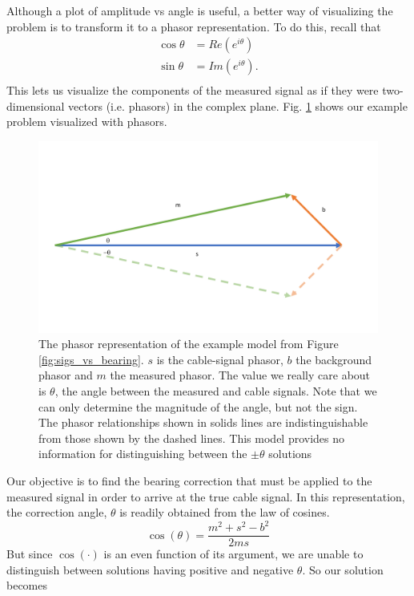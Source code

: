 \documentclass[paper=a4, fontsize=11pt]{scrartcl}
\numberwithin{equation}{section}		%
\numberwithin{figure}{section}			%
\numberwithin{table}{section}				%
\begin{document}
\begin{appendices}
Although a plot of amplitude vs angle is useful, a better way of visualizing the problem is to transform it to a phasor representation.  To do this, recall that
\begin{align}
        \cos{\theta} &= Re\left(e^{i\theta}\right) \\
        \sin{\theta} &= Im\left(e^{i\theta}\right). \\
\end{align}
This lets us visualize the components of the measured signal as if they were two-dimensional vectors (i.e. phasors) in the complex plane. Fig. \ref{fig:phasor_base} shows our example problem visualized with phasors.
\begin{figure}
  \caption{
  The phasor representation of the example model from Figure \ref{fig:sigs_vs_bearing}. $s$ is the cable-signal phasor, $b$ the background phasor and $m$ the measured phasor.  The value we really care about is $\theta$, the angle between the measured and cable signals.  Note that we can only determine the magnitude of the angle, but not the sign.  The phasor relationships shown in solids lines are indistinguishable from those shown by the dashed lines.  This model provides no information for distinguishing between the $\pm\theta$ solutions}
  \label{fig:phasor_base}
  \centering
  \includegraphics[width=1.0\textwidth]{figures/phasor_base.pdf}
\end{figure}
Our objective is to find the bearing correction that must be applied to the measured signal in order to arrive at the true cable signal. In this representation, the correction angle, $\theta$ is readily obtained from the law of cosines.
\begin{equation} \label{eq:law_of_cos}
    \cos\left(\theta\right) = \frac{m^2 + s^2 - b^2}{2ms}
\end{equation}
But since $\cos\left(\cdot\right)$ is an even function of its argument, we are unable to distinguish between solutions having positive and negative $\theta$.  So our solution becomes


\end{appendices}
\end{document}
